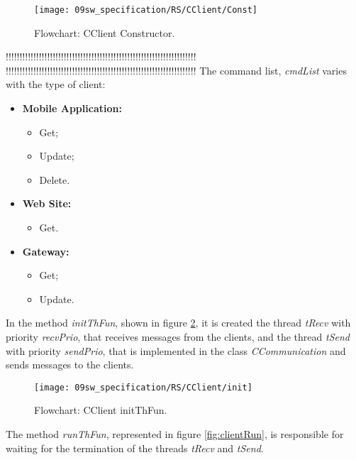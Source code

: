 \begin{figure}[H]
	\centering
	\texttt{[image: 09sw\_specification/RS/CClient/Const]}
	\caption{Flowchart: CClient Constructor.}
	\label{fig:ClientConst}
\end{figure}

!!!!!!!!!!!!!!!!!!!!!!!!!!!!!!!!!!!!!!!!!!!!!!!!!!!!!!!!!!!!!!!!!!!!!
!!!!!!!!!!!!!!!!!!!!!!!!!!!!!!!!!!!!!!!!!!!!!!!!!!!!!!!!!!!!!!!!!!!!!
The command list, \textit{cmdList} varies with the type of client:

\begin{itemize}
	\item \textbf{Mobile Application:} 
		\begin{itemize}
			\item Get;
			\item Update;
			\item Delete.
		\end{itemize}
	
	\item \textbf{Web Site:}
		\begin{itemize}
			\item Get.			
		\end{itemize}
	
	\item \textbf{Gateway:}
		\begin{itemize}
			\item Get;
			\item Update.
		\end{itemize}

\end{itemize}

In the method \textit{initThFun}, shown in figure \ref{fig:clientInit}, it is created the thread \textit{tRecv} with priority \textit{recvPrio}, that receives messages from the clients, and the thread \textit{tSend} with priority \textit{sendPrio}, that is implemented in the class \textit{CCommunication} and sends messages to the clients.

\begin{figure}[H]
	\centering
	\texttt{[image: 09sw\_specification/RS/CClient/init]}
	\caption{Flowchart: CClient initThFun.}
	\label{fig:clientInit}
\end{figure}

The method \textit{runThFun}, represented in figure \ref{fig:clientRun}, is responsible for waiting for the termination of the threads \textit{tRecv} and \textit{tSend}.

